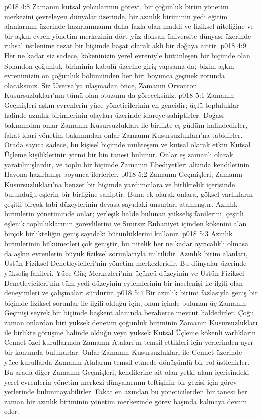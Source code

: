\vs p018 4:8 Zamanın kutsal yolcularının görevi, bir çoğunluk birim yönetim merkezini çevreleyen dünyalar üzerinde, bir azınlık biriminin yedi eğitim alanlarının üzerinde hazırlanmanın daha fazla olan maddi ve fiziksel niteliğine ve bir aşkın evren yönetim merkezinin dört yüz doksan üniversite dünyası üzerinde ruhsal üstlenime tezat bir biçimde başat olarak akli bir doğaya aittir.
\vs p018 4:9 Her ne kadar siz sadece, kökeninizin yerel evreniyle bütünleşen bir biçimde olan Splandon çoğunluk biriminin kabulü üzerine giriş yapsanız da; bizim aşkın evrenimizin on çoğunluk bölümünden her biri boyunca geçmek zorunda olacaksınız. Siz Uversa’ya ulaşmadan önce, Zamanın Orvonton Kusursuzlukları’nın tümü olan otuzunu da göreceksiniz.
\vs p018 5:1 Zamanın Geçmişleri aşkın evrenlerin yüce yöneticilerinin en gencidir; üçlü topluluklar halinde azınlık birimlerinin olayları üzerinde idareye sahiptirler. Doğası bakımından onlar Zamanın Kusursuzlukları ile birlikte eş güdüm halindedirler, fakat idari yönetim bakımından onlar Zamanın Kusursuzlukları’na tabidirler. Orada sayıca sadece, bu kişisel biçimde muhteşem ve kutsal olarak etkin Kutsal Üçleme kişiliklerinin yirmi bir bin tanesi bulunur. Onlar eş zamanlı olarak yaratılmışlardır, ve toplu bir biçimde Zamanın Ebediyetleri altında kendilerinin Havona hazırlanışı boyunca ilerlerler.
\vs p018 5:2 Zamanın Geçmişleri, Zamanın Kusursuzlukları’na benzer bir biçimde yardımcılara ve birliktelik içerisinde bulunduğu eşlerin bir birliğine sahiptir. Buna ek olarak onlara, göksel varlıkların çeşitli birçok tabi düzeylerinin devasa sayıdaki unsurları atanmıştır. Azınlık birimlerin yönetiminde onlar; yerleşik halde bulunan yükseliş fanilerini, çeşitli eşlenik topluluklarının görevlilerini ve Sınırsız Ruhaniyet içinden kökenini alan birçok birlikteliğin geniş sayıdaki bütünlüklerini kullanır.
\vs p018 5:3 Azınlık birimlerinin hükümetleri çok geniştir, bu nitelik her ne kadar ayrıcalıklı olmasa da aşkın evrenlerin büyük fiziksel sorunlarıyla iniltilidir. Azınlık birim alanları, Üstün Fiziksel Denetleyicileri’nin yönetim merkezleridir. Bu dünyalar üzerinde yükseliş fanileri, Yüce Güç Merkezleri’nin üçüncü düzeyinin ve Üstün Fiziksel Denetleyicileri’nin tüm yedi düzeyinin eylemlerinin bir incelenişi ile ilgili olan deneyimleri ve çalışmaları sürdürür.
\vs p018 5:4 Bir azınlık birimi fazlasıyla geniş bir biçimde fiziksel sorunlar ile ilgili olduğu için, onun içinde bulunan üç Zamanın Geçmişi seyrek bir biçimde başkent alanında beraberce mevcut haldedirler. Çoğu zaman onlardan biri yüksek denetim çoğunluk biriminin Zamanın Kusursuzlukları ile birlikte görüşme halinde olduğu veya yüksek Kutsal Üçleme kökenli varlıkların Cennet özel kurullarında Zamanın Ataları’nı temsil ettikleri için yerlerinden ayrı bir konumda bulunurlar. Onlar Zamanın Kusursuzlukları ile Cennet üzerinde yüce kurullarda Zamanın Atalarını temsil etmede dönüşümlü bir rol üstlenirler. Bu arada diğer Zamanın Geçmişleri, kendilerine ait olan yetki alanı içerisindeki yerel evrenlerin yönetim merkezi dünyalarının teftişinin bir gezisi için görev yerlerinde bulunmayabilirler. Fakat en azından bu yöneticilerden bir tanesi her zaman bir azınlık biriminin yönetim merkezinde görev başında kalmaya devam eder.
